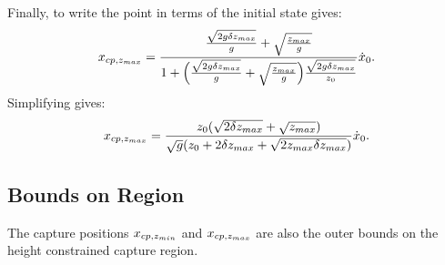 Finally, to write the point in terms of the initial state gives:
\begin{equation}
 x_{cp,z_{max}}  = \frac{\frac{\sqrt{2g\delta z_{max}}}{g}+\sqrt{\frac{z_{max}}{g}}}{ 1+\Big(\frac{\sqrt{2g\delta z_{max}}}{g}+\sqrt{\frac{z_{max}}{g}}\Big)\frac{\sqrt{2g\delta z_{max}}}{z_0}}\dot{x}_0.
\end{equation}
Simplifying gives:
\begin{equation}
	 x_{cp,z_{max}} = \frac{z_0(\sqrt{2\delta{z_{max}}}+\sqrt{z_{max}})}{\sqrt{g}(z_0 + 2\delta{z_{max}} + \sqrt{2z_{max}\delta{z_{max}}})}\dot{x}_0.
\end{equation}

\subsection{Bounds on Region}
The capture positions $x_{cp,z_{min}}$ and $x_{cp,z_{max}}$ are also the outer bounds on the height constrained capture region.

